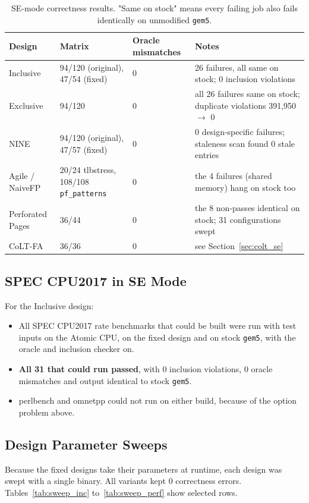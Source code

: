 \begin{table}[H]
\centering
\small
\caption{SE-mode correctness results. "Same on stock" means every failing job also fails identically on unmodified \texttt{gem5}.}
\label{tab:se_matrix}
\begin{tabularx}{\textwidth}{l l l X}
\toprule
\textbf{Design} & \textbf{Matrix} & \textbf{Oracle mismatches} & \textbf{Notes} \\
\midrule
Inclusive & 94/120 (original), 47/54 (fixed) & 0 & 26 failures, all same on stock; 0 inclusion violations \\
Exclusive & 94/120 & 0 & all 26 failures same on stock; duplicate violations 391,950 $\rightarrow$ 0 \\
NINE & 94/120 (original), 47/57 (fixed) & 0 & 0 design-specific failures; staleness scan found 0 stale entries \\
Agile / NaiveFP & 20/24 tlbstress, 108/108 \texttt{pf\_patterns} & 0 & the 4 failures (shared memory) hang on stock too \\
Perforated Pages & 36/44 & 0 & the 8 non-passes identical on stock; 31 configurations swept \\
CoLT-FA & 36/36 & 0 & see Section~\ref{sec:colt_se} \\
\bottomrule
\end{tabularx}
\end{table}

\subsection{SPEC CPU2017 in SE Mode}
For the Inclusive design:
\begin{itemize}
    \item All SPEC CPU2017 rate benchmarks that could be built were run with test inputs on the Atomic CPU, on the fixed design and on stock \texttt{gem5}, with the oracle and inclusion checker on.
    \item \textbf{All 31 that could run passed}, with 0 inclusion violations, 0 oracle mismatches and output identical to stock \texttt{gem5}.
    \item perlbench and omnetpp could not run on either build, because of the option problem above.
\end{itemize}

\subsection{Design Parameter Sweeps}
Because the fixed designs take their parameters at runtime, each design was swept with a single binary. All variants kept 0 correctness errors. Tables~\ref{tab:sweep_inc} to~\ref{tab:sweep_perf} show selected rows.

